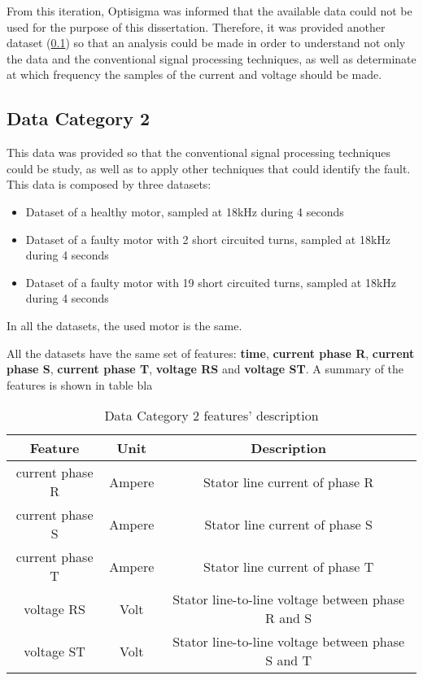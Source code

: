 From this iteration, Optisigma was informed that the available data could not be used for the purpose of this dissertation.
Therefore, it was provided another dataset (\ref{subsec:data_category_2}) so that an analysis could be made in order to understand not only the data and the conventional signal processing techniques, as well as determinate at which frequency the samples of the current and voltage should be made.

\subsection{Data Category 2}
\label{subsec:data_category_2}

This data was provided so that the conventional signal processing techniques could be study, as well as to apply other techniques that could identify the fault. This data is composed by three datasets:

\begin{itemize}
  \item 
  Dataset of a healthy motor, sampled at 18kHz during 4 seconds
  \item 
  Dataset of a faulty motor with 2 short circuited turns, sampled at 18kHz during 4 seconds
  \item 
  Dataset of a faulty motor with 19 short circuited turns, sampled at 18kHz during 4 seconds
\end{itemize}

In all the datasets, the used motor is the same.

All the datasets have the same set of features:  \textbf{time}, \textbf{current phase R}, \textbf{current phase S}, \textbf{current phase T}, \textbf{voltage RS} and \textbf{voltage ST}. A summary of the features is shown in table bla

\begin{table}[htpb]
\centering
\caption{Data Category 2 features' description}
\label{my-label}
\begin{tabular}{@{}ccc@{}}
\toprule
\textbf{Feature} & \textbf{Unit} &                                                   \textbf{Description} \\ \midrule
current phase R  & Ampere        & Stator line current of phase R                    \\
current phase S  & Ampere        & Stator line current of phase S                    \\
current phase T  & Ampere        & Stator line current of phase T                    \\
voltage RS       & Volt          & Stator line-to-line voltage between phase R and S \\
voltage ST       & Volt          & Stator line-to-line voltage between phase S and T \\ \bottomrule
\end{tabular}
\end{table}


